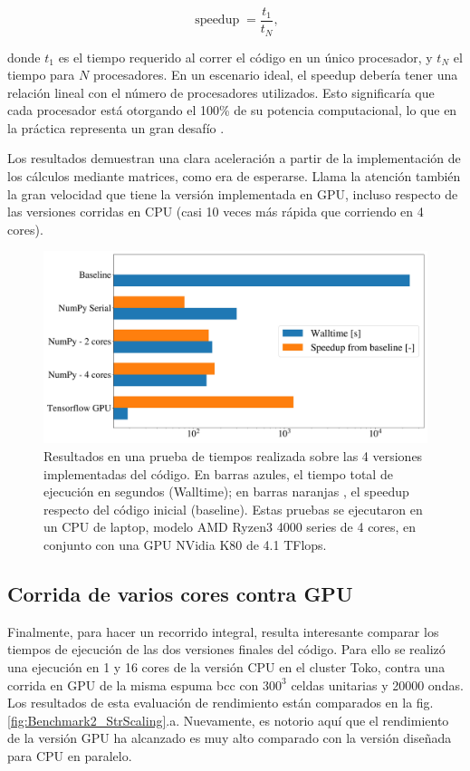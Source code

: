 \documentclass{article}
\begin{document}
\begin{equation}
    \operatorname{speedup} = \frac{t_1}{t_N},
\end{equation}

donde $t_1$ es el tiempo requerido al correr el código en un único procesador, y $t_N$ el tiempo para $N$ procesadores. En un escenario ideal, el speedup debería tener una relación lineal con el número de procesadores utilizados. Esto significaría que cada procesador está otorgando el 100\% de su potencia computacional, lo que en la práctica representa un gran desafío \cite{Amdahl1967}.

Los resultados demuestran una clara aceleración a partir de la implementación de los cálculos mediante matrices, como era de esperarse. Llama la atención también la gran velocidad que tiene la versión implementada en GPU, incluso respecto de las versiones corridas en CPU (casi 10 veces más rápida que corriendo en 4 cores).

\begin{figure}[H]
    \centering
    \includegraphics[width=.7\textwidth]{figs/Benchmarks1.jpg}
    \caption{Resultados en una prueba de tiempos realizada sobre las 4 versiones implementadas del código. En barras azules, el tiempo total de ejecución en segundos (Walltime); en barras naranjas , el speedup respecto del código inicial (baseline). Estas pruebas se ejecutaron en un CPU de laptop, modelo AMD Ryzen3 4000 series de 4 cores, en conjunto con una GPU NVidia K80 de 4.1 TFlops.}
    \label{fig:benchmark1}
\end{figure}

\subsection{Corrida de varios cores contra GPU}

Finalmente, para hacer un recorrido integral, resulta interesante comparar los tiempos de ejecución de las dos versiones finales del código. Para ello se realizó una ejecución en 1 y 16 cores de la versión CPU en el cluster Toko, contra una corrida en GPU de la misma espuma bcc con $300^3$ celdas unitarias y 20000 ondas. Los resultados de esta evaluación de rendimiento están comparados en la fig. \ref{fig:Benchmark2_StrScaling}.a. Nuevamente, es notorio aquí que el rendimiento de la versión GPU ha alcanzado es muy alto comparado con la versión diseñada para CPU en paralelo.
\end{document}
